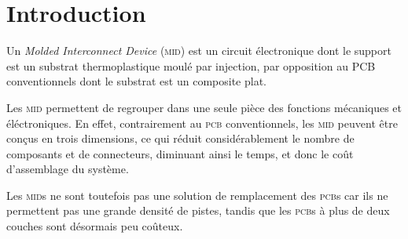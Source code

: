 \section{Introduction}
Un \emph{Molded Interconnect Device} (\textsc{mid}) est un circuit électronique
dont le support est un substrat thermoplastique moulé par injection, par
opposition au \textsc{PCB} conventionnels dont le substrat est un composite
plat.

Les \textsc{mid} permettent de regrouper dans une seule pièce des fonctions
mécaniques et éléctroniques. En effet, contrairement au \textsc{pcb} conventionnels, les
\textsc{mid} peuvent être conçus en trois dimensions, ce qui réduit
considérablement le nombre de composants et de connecteurs, diminuant ainsi le
temps, et donc le coût d'assemblage du système. 

Les \textsc{mid}s ne sont toutefois pas une solution de remplacement des
\textsc{pcb}s car ils ne permettent pas une grande densité de pistes, tandis que
les \textsc{pcb}s à plus de deux couches sont désormais peu coûteux.
